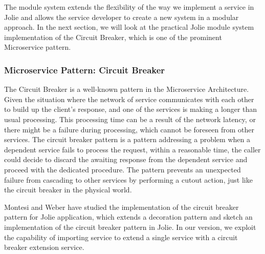 The module system extends the flexibility of the way we implement a service in Jolie and allows the service developer to create a new system in a modular approach. In the next section, we will look at the practical Jolie module system implementation of the Circuit Breaker, which is one of the prominent  Microservice pattern. 

\subsubsection{Microservice Pattern: Circuit Breaker}

The Circuit Breaker is a well-known pattern in the Microservice Architecture. Given the situation where the network of service communicates with each other to build up the client's response, and one of the services is making a longer than usual processing. This processing time can be a result of the network latency, or there might be a failure during processing, which cannot be foreseen from other services. The circuit breaker pattern is a pattern addressing a problem when a dependent service fails to process the request, within a reasonable time, the caller could decide to discard the awaiting response from the dependent service and proceed with the dedicated procedure. The pattern prevents an unexpected failure from cascading to other services by performing a cutout action, just like the circuit breaker in the physical world.

Montesi and Weber have studied the implementation of the circuit breaker pattern for Jolie application\cite{10.1145/3167132.3167427}, which extends a decoration pattern and sketch an implementation of the circuit breaker pattern in Jolie. In our version, we exploit the capability of importing service to extend a single service with a circuit breaker extension service.


